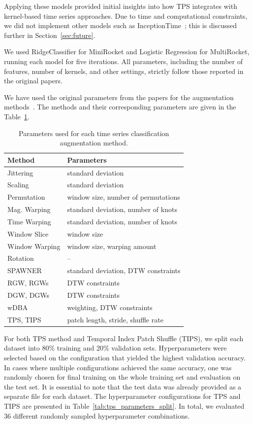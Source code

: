 Applying these models provided initial insights into how TPS integrates with kernel-based time series approaches. Due to time and computational constraints, we did not implement other models such as InceptionTime~\cite{Ismail_Fawaz_2020}; this is discussed further in Section~\ref{sec:future}.


We used RidgeClassifier for MiniRocket and Logistic Regression for MultiRocket, running each model for five iterations. All parameters, including the number of features, number of kernels, and other settings, strictly follow those reported in the original papers.

We have used the original parameters from the papers for the augmentation methods~\cite{10.1371/journal.pone.0254841}. The methods and their corresponding parameters are given in the Table~\ref{tab:tsc_aug_params}.

\begin{table}[h!]
\centering
\begin{tabular}{@{}ll@{}}
\toprule
\textbf{Method} & \textbf{Parameters} \\
\midrule
Jittering        & standard deviation \\
Scaling          & standard deviation \\
Permutation      & window size, number of permutations \\
Mag. Warping  & standard deviation, number of knots \\
Time Warping  & standard deviation, number of knots \\
Window Slice  & window size \\
Window Warping  & window size, warping amount \\
Rotation         & – \\
SPAWNER          & standard deviation, DTW constraints \\
RGW, RGWs        & DTW constraints \\
DGW, DGWs        & DTW constraints \\
wDBA             & weighting, DTW constraints \\
TPS, TIPS              & patch length, stride, shuffle rate \\
\bottomrule
\end{tabular}
\caption{Parameters used for each time series classification augmentation method.}
\label{tab:tsc_aug_params}
\end{table}

For both TPS method and Temporal Index Patch Shuffle (TIPS), we split each dataset into 80\% training and 20\% validation sets. Hyperparameters were selected based on the configuration that yielded the highest validation accuracy. In cases where multiple configurations achieved the same accuracy, one was randomly chosen for final training on the whole training set and evaluation on the test set. It is essential to note that the test data was already provided as a separate file for each dataset. The hyperparameter configurations for TPS and TIPS are presented in Table~\ref{tab:tps_parameters_split}. In total, we evaluated 36 different randomly sampled hyperparameter combinations.

